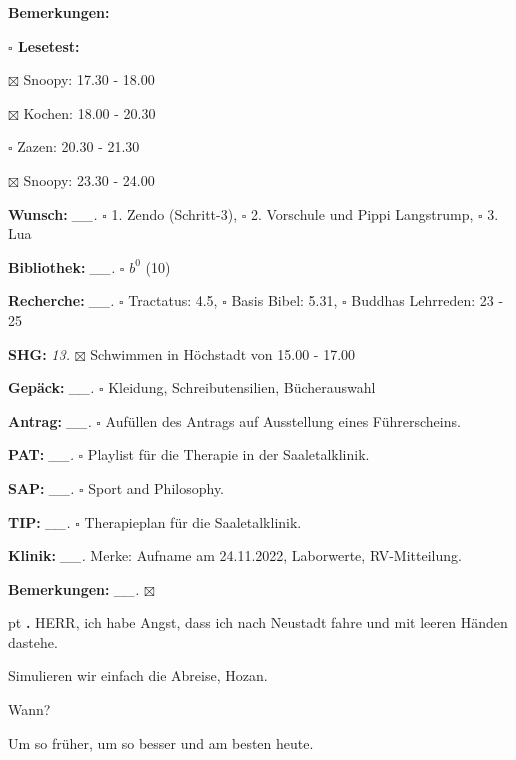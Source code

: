 \documentclass[10pt,a4paper]{article}
\newcounter{notec}
\newcommand\notep[1]{%
  \stepcounter{notec}
  \vskip #1pt
  {\bf\arabic{notec}.}
}
\newcommand\prop[1] {{\color {alizarin} {\bf #1}}}             %
\newcommand\opti[1] {{\color {amethyst} {\bf #1}}}             %
\newcommand\mand[1] {{\color {burntorange} {\bf #1}}}          %
\newcommand\bottomspace{\vskip 4pt}
\newcommand\n[1] { {\sl #1.} \hskip 5pt }
\begin{document}
\begin{mdframed}[style=daystyle]
\begin{labeling}{{\mand {Bemerkungen:}}}
\begin{minipage}{0.75\textwidth}
\begin{labeling}{\prop {$\square$ Lesetest:}}
      \item[$\boxtimes$ Snoopy:]   17.30 - 18.00
      \item[$\boxtimes$ Kochen:]   18.00 - 20.30
        
      \item[$\square$ Zazen:]    20.30 - 21.30
      \item[$\boxtimes$ Snoopy:]   23.30 - 24.00
      \end{labeling}
    \end{minipage}
    \bottomspace
  \item[{\mand {Wunsch:}}]       \n{\_\_} $\square$ 1. Zendo (Schritt-3),
      $\square$ 2. Vorschule und Pippi Langstrump, $\square$ 3. Lua
  \item[{\mand {Bibliothek:}}]   \n{\_\_} $\square$ $b^{0}$ (10)
  \item[{\mand {Recherche:}}]    \n{\_\_} $\square$ Tractatus: 4.5, $\square$ Basis Bibel: 5.31,
      $\square$ Buddhas Lehrreden: 23 - 25
  \item[{\mand {SHG:}}]            \n{13} $\boxtimes$ Schwimmen in Höchstadt von 15.00 - 17.00
  \item[{\mand {Gepäck:}}]       \n{\_\_} $\square$ Kleidung, Schreibutensilien, Bücherauswahl
  \item[{\opti {Antrag:}}]       \n{\_\_} $\square$ Aufüllen des Antrags auf Ausstellung eines Führerscheins.
  \item[{\opti {PAT:}}]          \n{\_\_} $\square$ Playlist für die Therapie in der Saaletalklinik.
  \item[{\opti {SAP:}}]          \n{\_\_} $\square$ Sport and Philosophy.
  \item[{\opti {TIP:}}]          \n{\_\_} $\square$ Therapieplan für die Saaletalklinik.
  \item[{\opti {Klinik:}}]       \n{\_\_} Merke: Aufname am 24.11.2022, Laborwerte, RV-Mitteilung.
  \item[{\mand {Bemerkungen:}}]  \n{\_\_} $\boxtimes$
  \end{labeling}
    
  \setcounter{notec}{0}
  
  \notep 0 HERR, ich habe Angst, dass ich nach Neustadt fahre und mit leeren
  Händen dastehe.

  \vskip 2pt
  Simulieren wir einfach die Abreise, Hozan.

  \vskip 2pt
  Wann?

  \vskip 2pt
  Um so früher, um so besser und am besten heute.


\end{mdframed}
\end{document}
